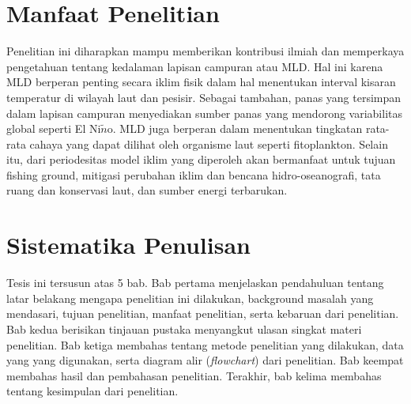 \begin{spacing}{1.5}
	\section[Manfaat Penelitian]{Manfaat Penelitian}
	
	Penelitian ini diharapkan mampu memberikan kontribusi ilmiah dan memperkaya pengetahuan tentang kedalaman lapisan campuran atau MLD. Hal ini karena MLD berperan penting secara iklim fisik dalam hal menentukan interval kisaran temperatur di wilayah laut dan pesisir. Sebagai tambahan, panas yang tersimpan dalam lapisan campuran menyediakan sumber panas yang mendorong variabilitas global seperti El Ni$\tilde{n}$o. MLD juga berperan dalam menentukan tingkatan rata-rata cahaya yang dapat dilihat oleh organisme laut seperti fitoplankton. Selain itu, dari periodesitas model iklim yang diperoleh akan bermanfaat untuk tujuan fishing ground, mitigasi perubahan iklim dan bencana hidro-oseanografi, tata ruang dan konservasi
	laut, dan sumber energi terbarukan. 

	\section[Sistematika Penulisan]{Sistematika Penulisan}

	Tesis ini tersusun atas 5 bab. Bab pertama menjelaskan pendahuluan tentang latar belakang mengapa penelitian ini dilakukan, background masalah yang mendasari, tujuan penelitian, manfaat penelitian, serta kebaruan dari penelitian. Bab kedua berisikan tinjauan pustaka menyangkut ulasan singkat materi penelitian. Bab ketiga membahas tentang metode penelitian yang dilakukan, data yang yang digunakan, serta diagram alir (\textit{flowchart}) dari penelitian. Bab keempat membahas hasil dan pembahasan penelitian. Terakhir, bab kelima membahas tentang kesimpulan dari penelitian.
	
\end{spacing}
